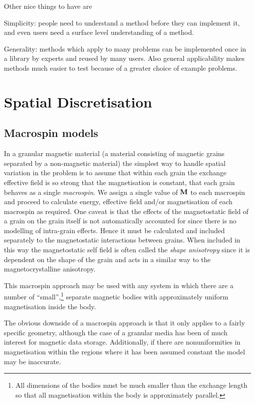 Other nice things to have are

Simplicity: people need to understand a method before they can implement it, and even users need a surface level understanding of a method.

Generality: methods which apply to many problems can be implemented once in a library by experts and reused by many users.
Also general applicability makes methods much easier to test because of a greater choice of example problems.


\section{Spatial Discretisation}
\label{sec:spat-discr}

\subsection{Macrospin models}
\label{sec:sd-macrospins}

In a granular magnetic material (a material consisting of magnetic grains separated by a non-magnetic material) the simplest way to handle spatial variation in the problem is to assume that within each grain the exchange effective field is so strong that the magnetisation is constant, \ie that each grain behaves as a single \emph{macrospin}.
We assign a single value of $\boldsymbol{\mathrm{M}}$ to each macrospin and proceed to calculate energy, effective field and/or magnetisation of each macrospin as required.
One caveat is that the effects of the magnetostatic field of a grain on the grain itself is not automatically accounted for since there is no modelling of intra-grain effects.
Hence it must be calculated and included separately to the magnetostatic interactions between grains.
When included in this way the magnetostatic self field is often called the \emph{shape anisotropy} since it is dependent on the shape of the grain and acts in a similar way to the magnetocrystalline anisotropy.

This macrospin approach may be used with any system in which there are a number of ``small'',\footnote{All dimensions of the bodies must be much smaller than the exchange length so that all magnetisation within the body is approximately parallel.} separate magnetic bodies with approximately uniform magnetisation inside the body.

The obvious downside of a macrospin approach is that it only applies to a fairly specific geometry, although the case of a granular media has been of much interest for magnetic data storage.
Additionally, if there are nonuniformities in magnetisation within the regions where it has been assumed constant the model may be inaccurate.

